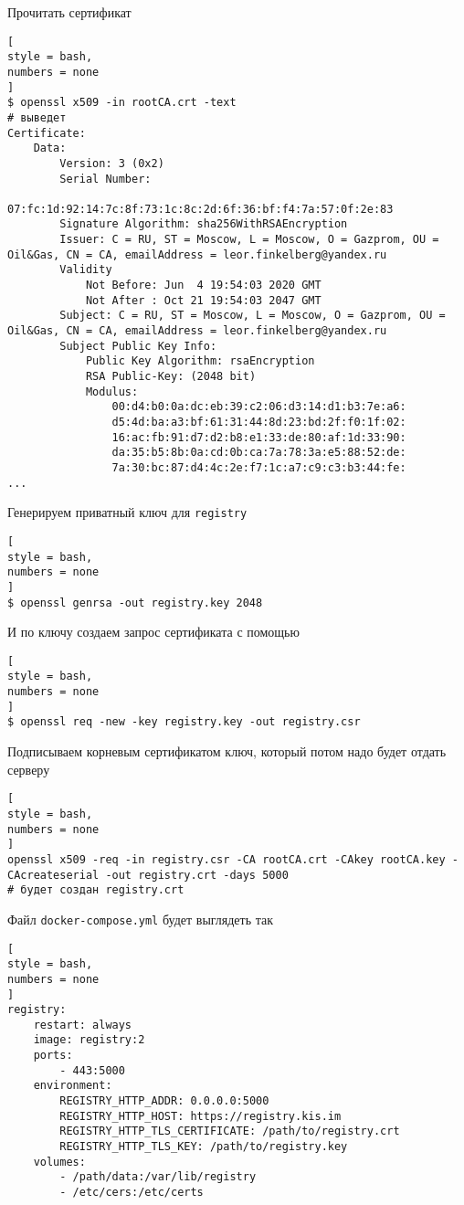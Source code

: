 \documentclass[%
	11pt,
	a4paper,
	utf8,
		]{article}
\begin{document}
Прочитать сертификат
\begin{lstlisting}[
style = bash,
numbers = none
]
$ openssl x509 -in rootCA.crt -text
# выведет
Certificate:
    Data:
        Version: 3 (0x2)
        Serial Number:
            07:fc:1d:92:14:7c:8f:73:1c:8c:2d:6f:36:bf:f4:7a:57:0f:2e:83
        Signature Algorithm: sha256WithRSAEncryption
        Issuer: C = RU, ST = Moscow, L = Moscow, O = Gazprom, OU = Oil&Gas, CN = CA, emailAddress = leor.finkelberg@yandex.ru
        Validity
            Not Before: Jun  4 19:54:03 2020 GMT
            Not After : Oct 21 19:54:03 2047 GMT
        Subject: C = RU, ST = Moscow, L = Moscow, O = Gazprom, OU = Oil&Gas, CN = CA, emailAddress = leor.finkelberg@yandex.ru
        Subject Public Key Info:
            Public Key Algorithm: rsaEncryption
            RSA Public-Key: (2048 bit)
            Modulus:
                00:d4:b0:0a:dc:eb:39:c2:06:d3:14:d1:b3:7e:a6:
                d5:4d:ba:a3:bf:61:31:44:8d:23:bd:2f:f0:1f:02:
                16:ac:fb:91:d7:d2:b8:e1:33:de:80:af:1d:33:90:
                da:35:b5:8b:0a:cd:0b:ca:7a:78:3a:e5:88:52:de:
                7a:30:bc:87:d4:4c:2e:f7:1c:a7:c9:c3:b3:44:fe:
...
\end{lstlisting}

Генерируем приватный ключ для \texttt{registry}
\begin{lstlisting}[
style = bash,
numbers = none
]
$ openssl genrsa -out registry.key 2048
\end{lstlisting}

И по ключу создаем запрос сертификата с помощью
\begin{lstlisting}[
style = bash,
numbers = none
]
$ openssl req -new -key registry.key -out registry.csr
\end{lstlisting}

Подписываем корневым сертификатом ключ, который потом надо будет отдать серверу
\begin{lstlisting}[
style = bash,
numbers = none
]
openssl x509 -req -in registry.csr -CA rootCA.crt -CAkey rootCA.key -CAcreateserial -out registry.crt -days 5000
# будет создан registry.crt
\end{lstlisting}

Файл \texttt{docker-compose.yml} будет выглядеть так
\begin{lstlisting}[
style = bash,
numbers = none
]
registry:
    restart: always
    image: registry:2
    ports:
        - 443:5000
    environment:
        REGISTRY_HTTP_ADDR: 0.0.0.0:5000
        REGISTRY_HTTP_HOST: https://registry.kis.im
        REGISTRY_HTTP_TLS_CERTIFICATE: /path/to/registry.crt
        REGISTRY_HTTP_TLS_KEY: /path/to/registry.key
    volumes:
        - /path/data:/var/lib/registry
        - /etc/cers:/etc/certs
\end{lstlisting}
\end{document}
